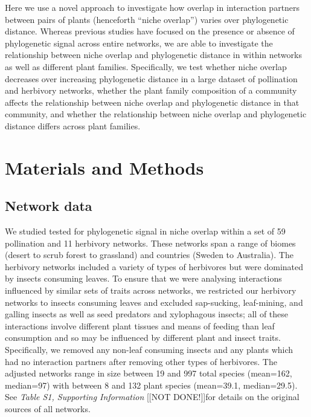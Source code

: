 \documentclass[12pt]{article}
\begin{document}
\begin{spacing}{1.5}
  Here we use a novel approach to investigate how overlap in 
  interaction partners between pairs of plants (henceforth ``niche 
  overlap'') varies over phylogenetic distance. Whereas previous 
  studies have focused on the presence or absence of phylogenetic
  signal across entire networks, we are able to investigate the
  relationship between niche overlap and phylogenetic distance in
  within networks as well as different plant families. Specifically,
  we test whether niche overlap decreases over increasing phylogenetic
  distance in a large dataset of pollination and herbivory networks, 
  whether the plant family composition of a community affects the
  relationship between niche overlap and phylogenetic distance in that 
  community, and whether the relationship between niche overlap and 
  phylogenetic distance differs across plant families.


\section*{Materials and Methods}

\subsection*{Network data}

  We studied tested for phylogenetic signal in niche overlap within a 
  set of 59 pollination and 11 herbivory networks. These networks span 
  a range of biomes (desert to scrub forest to grassland) and 
  countries (Sweden to Australia). The herbivory networks included a 
  variety of types of herbivores but were dominated by insects 
  consuming leaves. To ensure that we were analysing interactions 
  influenced by similar sets of traits across networks, we restricted 
  our herbivory networks to insects consuming leaves and excluded 
  sap-sucking, leaf-mining, and galling insects as well as seed 
  predators and xylophagous insects; all of these interactions involve 
  different plant tissues and means of feeding than leaf consumption 
  and so may be influenced by different plant and insect traits. 
  Specifically, we removed any non-leaf consuming insects and any 
  plants which had no interaction partners after removing other types  
  of herbivores. The adjusted networks range in size between 19 and 
  997 total species (mean=162, median=97) with  between 8 and 132 
  plant species (mean=39.1, median=29.5). See \emph{Table S1, 
  Supporting Information} [[NOT DONE!]]for details on the original sources of all 
  networks. 


\end{spacing}
\end{document}
